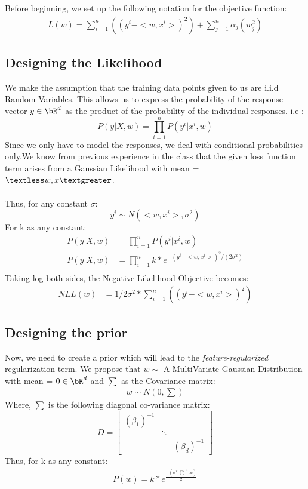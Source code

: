 \documentclass[a4paper,11pt]{article}
\begin{document}
\begin{mlsolution}
Before beginning, we set up the following notation for the objective function:
\begin{align}
    L(w) = \sum_{i=1}^{n}((y^i - <w,x^i>)^2) + \sum_{j=1}^{n} \alpha_{j}(w_{j}^2) 
\end{align}

\subsection*{Designing the Likelihood}
We make the assumption that the training data points given to us are i.i.d Random Variables. This allows us to express the probability of the response vector $ y \in \bR^d$ as the product of the probability of the individual responses. i.e : 
\begin{equation}
    P(y|X,w) =  \prod_{i=1}^{n} P(y^i|x^i,w)
\end{equation}
Since we only have to model the responses, we deal with conditional probabilities only.We know from previous experience in the class that the given loss function term arises from a Gaussian Likelihood with mean = $\textless w,x \textgreater$. \\
\\
Thus, for any constant $\sigma$:
\begin{equation}
y^i \sim N(<w,x^i>,\sigma ^2)  
\end{equation}
For k as any constant:
\begin{align}
    P(y|X,w) &=  \prod_{i=1}^{n} P(y^i|x^i,w)\\
    P(y|X,w) &=  \prod_{i=1}^{n} k * e^{-(y^i - <w,x^i>)^2/(2\sigma^2)}\\
\end{align}
Taking log both sides, the Negative Likelihood Objective becomes:
\begin{align}
    NLL(w) &=  1/2\sigma^2 * \sum_{i=1}^{n}((y^i - <w,x^i>)^2)
\end{align}

\subsection*{Designing the prior}
Now, we need to create a prior which will lead to the \emph{feature-regularized} regularization term. We propose that $w \sim$ A MultiVariate Gaussian Distribution with mean = $0 \in \bR^d$ and $\sum$ as the Covariance matrix:
\begin{align}
    w \sim N(0,\sum)
\end{align}
Where, $\sum$ is the following diagonal co-variance matrix: \\
\[
  D =
  \begin{bmatrix}
    (\beta_{1})^{-1} & & \\
    & \ddots & \\
    & & (\beta_{d})^{-1}
  \end{bmatrix}
\]
Thus, for k as any constant:\\
\begin{align}
    P(w) = k*e^{\frac{-(w^T.\sum^{-1}.w)}{2}}
\end{align}


\end{mlsolution}
\end{document}
